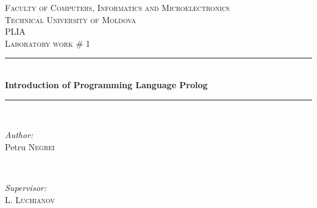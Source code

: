 \documentclass[12pt]{article}
\begin{document}
  \begin{titlepage}

 \newcommand{\HRule}{\rule{\linewidth}{0.5mm}} %
  \begin{center} %

  \textsc{\large Faculty of Computers, Informatics and Microelectronics}\\[0.5cm]
  \textsc{\large Technical University of Moldova}\\[1.2cm] %
  \vspace{35 mm}
  \textsc{\Large PLIA}\\[0.5cm] %
  \textsc{\large Laboratory work \# 1}\\[0.5cm] %

  \vspace{10 mm}
  \HRule \\[0.4cm]
  { \LARGE \bfseries Introduction of Programming Language Prolog}\\[0.4cm] %
  \HRule \\[1.5cm]

      \vspace{35mm}

      \begin{minipage}{0.4\textwidth}
      \begin{flushleft} \large
      \emph{Author:}\\
      Petru \textsc{Negrei} %
      \end{flushleft}
      \end{minipage}
      ~
      \begin{minipage}{0.4\textwidth}
      \begin{flushright} \large
      \emph{Supervisor:} \\
      L. \textsc{Luchianov} %
      \end{flushright}
      \end{minipage}\\[4cm]


\end{center}
\end{titlepage}
\end{document}
